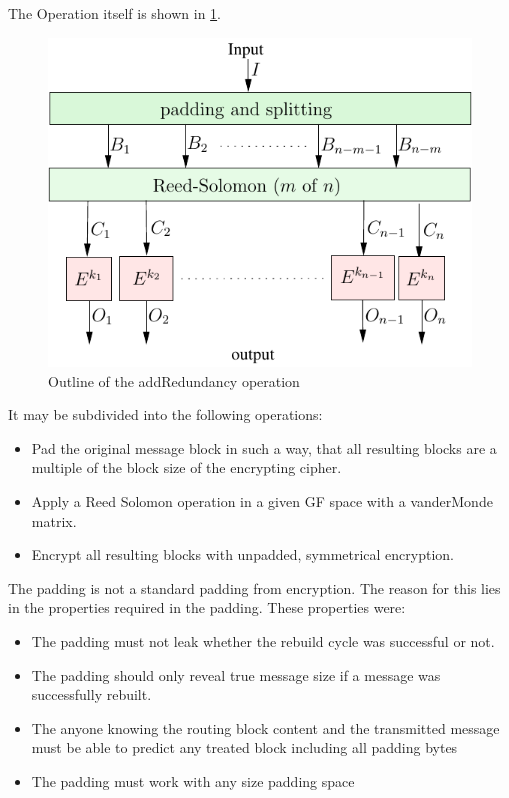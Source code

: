 \documentclass[10pt,journal,compsoc]{IEEEtran}
\let\MYoriglatexcaption\caption
\renewcommand{\caption}[2][\relax]{\MYoriglatexcaption[#2]{#2}}
\begin{document}
The Operation itself is shown in \ref{fig:addRedundancyOperation}. 
\begin{figure}[ht]\centering
	\includegraphics[width=0.8\columnwidth]{../../inc/addRedundancyOp}
	\caption{Outline of the addRedundancy operation}
	\label{fig:addRedundancyOperation}
\end{figure}
It may be subdivided into the following operations:
\begin{itemize}
	\item Pad the original message block in such a way, that all resulting blocks are a multiple of the block size of the encrypting cipher.
	\item Apply a Reed Solomon operation in a given GF space with a vanderMonde matrix.
	\item Encrypt all resulting blocks with unpadded, symmetrical encryption.
\end{itemize}

The padding is not a standard padding from encryption. The reason for this lies in the properties required in the padding. These properties were:
\begin{itemize}
	\item The padding must not leak whether the rebuild cycle was successful or not.
	\item The padding should only reveal true message size if a message was successfully rebuilt. 
	\item The anyone knowing the routing block content and the transmitted message must be able to predict any treated block including all padding bytes
	\item The padding must work with any size padding space
\end{itemize}
\end{document}
